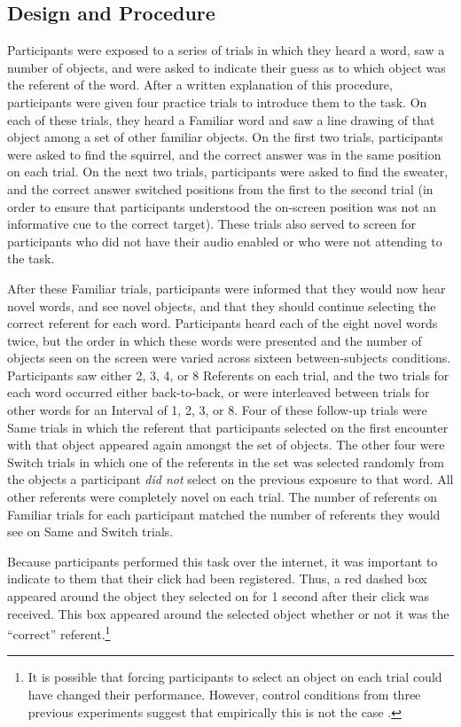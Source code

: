 \documentclass{pnastwo}
\begin{document}
\begin{article}
\subsection{Design and Procedure}

Participants were exposed to a series of trials in which they heard a word, saw a number of objects, and were asked to indicate their guess as to which object was the referent of the word. After a written explanation of this procedure, participants were given four practice trials to introduce them to the task. On each of these trials, they heard a Familiar word and saw a line drawing of that object among a set of other familiar objects. On the first two trials, participants were asked to find the squirrel, and the correct answer was in the same position on each trial. On the next two trials, participants were asked to find the sweater, and the correct answer switched positions from the first to the second trial (in order to ensure that participants understood the on-screen position was not an informative cue to the correct target). These trials also served to screen for participants who did not have their audio enabled or who were not attending to the task.

After these Familiar trials, participants were informed that they would now hear novel words, and see novel objects, and that they should continue selecting the correct referent for each word. Participants heard each of the eight novel words twice, but the order in which these words were presented and the number of objects seen on the screen were varied across sixteen between-subjects conditions. Participants saw either 2, 3, 4, or 8 Referents on each trial, and the two trials for each word occurred either back-to-back, or were interleaved between trials for other words for an Interval of 1, 2, 3, or 8. Four of these follow-up trials were Same trials in which the referent that participants selected on the first encounter with that object appeared again amongst the set of objects. The other four were Switch trials in which one of the referents in the set was selected randomly from the objects a participant \emph{did not} select on the previous exposure to that word. All other referents were completely novel on each trial. The number of referents on Familiar trials for each participant matched the number of referents they would see on Same and Switch trials.

Because participants performed this task over the internet, it was important to indicate to them that their click had been registered. Thus, a red dashed box appeared around the object they selected on for 1 second after their click was received. This box appeared around the selected object whether or not it was the ``correct'' referent.\footnote{It is possible that forcing participants to select an object on each trial could have changed their performance. However, control conditions from three previous experiments suggest that empirically this is not the case \cite{Medina2011, Smith2011a, Trueswell2013}.}


\end{article}
\end{document}
